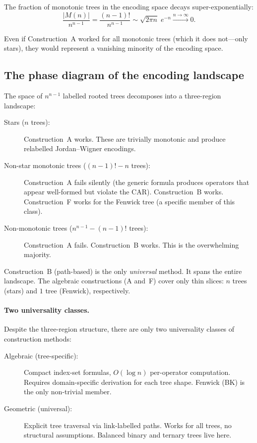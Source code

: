 \begin{corollary}
The fraction of monotonic trees in the encoding space decays
super-exponentially:
\begin{equation}
  \frac{|M(n)|}{n^{n-1}}
    = \frac{(n{-}1)!}{n^{n-1}}
    \sim \sqrt{2\pi n}\; e^{-n}
    \xrightarrow{n \to \infty} 0.
\end{equation}
\end{corollary}

Even if Construction~A worked for all monotonic trees (which it does
not---only stars), they would represent a vanishing minority of the
encoding space.

\subsection{The phase diagram of the encoding landscape}
\label{sec:st-phase}

The space of $n^{n-1}$ labelled rooted trees decomposes into a
three-region landscape:

\begin{description}
  \item[Stars ($n$ trees):] Construction~A works.  These are
    trivially monotonic and produce relabelled Jordan--Wigner
    encodings.

  \item[Non-star monotonic trees ($(n{-}1)! - n$ trees):]
    Construction~A fails silently (the generic formula produces
    operators that appear well-formed but violate the CAR).
    Construction~B works.
    Construction~F works for the Fenwick tree (a specific member
    of this class).

  \item[Non-monotonic trees ($n^{n-1} - (n{-}1)!$ trees):]
    Construction~A fails.  Construction~B works.  This is the
    overwhelming majority.
\end{description}

Construction~B (path-based) is the only \emph{universal} method.
It spans the entire landscape.  The algebraic constructions (A and~F)
cover only thin slices: $n$ trees (stars) and $1$ tree (Fenwick),
respectively.

\paragraph{Two universality classes.}
Despite the three-region structure, there are only two universality
classes of construction methods:
\begin{description}
  \item[Algebraic (tree-specific):] Compact index-set formulas,
    $O(\log n)$ per-operator computation.  Requires domain-specific
    derivation for each tree shape.  Fenwick (BK) is the only non-trivial
    member.
  \item[Geometric (universal):] Explicit tree traversal via
    link-labelled paths.  Works for all trees, no structural
    assumptions.  Balanced binary and ternary trees live here.
\end{description}

